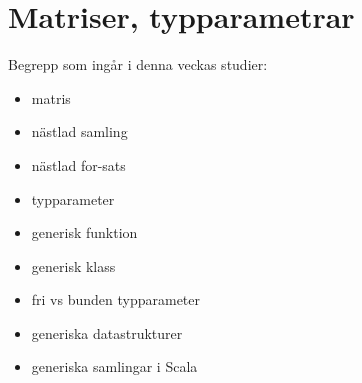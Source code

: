 \chapter{Matriser, typparametrar}\label{chapter:W08}
Begrepp som ingår i denna veckas studier:
\begin{itemize}[noitemsep,label={$\square$},leftmargin=*]
\item matris
\item nästlad samling
\item nästlad for-sats
\item typparameter
\item generisk funktion
\item generisk klass
\item fri vs bunden typparameter
\item generiska datastrukturer
\item generiska samlingar i Scala\end{itemize}
